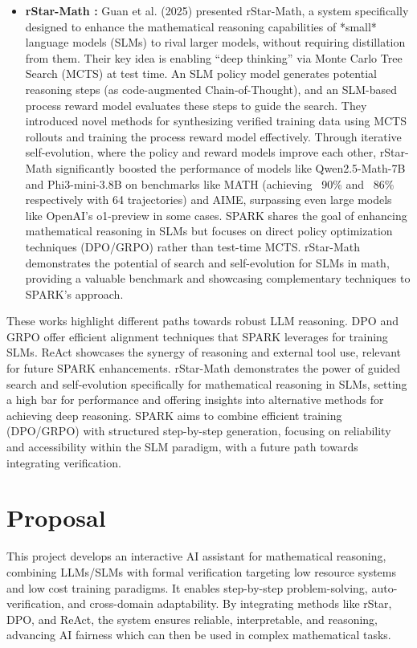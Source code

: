 \documentclass[11pt]{article}
\begin{document}
\begin{itemize}
    \item \textbf{rStar-Math \cite{guan2025rstar}:}
    Guan et al. (2025) presented rStar-Math, a system specifically designed to enhance the mathematical reasoning capabilities of *small* language models (SLMs) to rival larger models, without requiring distillation from them. Their key idea is enabling ``deep thinking'' via Monte Carlo Tree Search (MCTS) at test time. An SLM policy model generates potential reasoning steps (as code-augmented Chain-of-Thought), and an SLM-based process reward model evaluates these steps to guide the search. They introduced novel methods for synthesizing verified training data using MCTS rollouts and training the process reward model effectively. Through iterative self-evolution, where the policy and reward models improve each other, rStar-Math significantly boosted the performance of models like Qwen2.5-Math-7B and Phi3-mini-3.8B on benchmarks like MATH (achieving ~90\% and ~86\% respectively with 64 trajectories) and AIME, surpassing even large models like OpenAI's o1-preview in some cases. SPARK shares the goal of enhancing mathematical reasoning in SLMs but focuses on direct policy optimization techniques (DPO/GRPO) rather than test-time MCTS. rStar-Math demonstrates the potential of search and self-evolution for SLMs in math, providing a valuable benchmark and showcasing complementary techniques to SPARK's approach.
\end{itemize}

These works highlight different paths towards robust LLM reasoning. DPO and GRPO offer efficient alignment techniques that SPARK leverages for training SLMs. ReAct showcases the synergy of reasoning and external tool use, relevant for future SPARK enhancements. rStar-Math demonstrates the power of guided search and self-evolution specifically for mathematical reasoning in SLMs, setting a high bar for performance and offering insights into alternative methods for achieving deep reasoning. SPARK aims to combine efficient training (DPO/GRPO) with structured step-by-step generation, focusing on reliability and accessibility within the SLM paradigm, with a future path towards integrating verification.

\section{Proposal}
This project develops an interactive AI assistant for mathematical reasoning, combining LLMs/SLMs with formal verification targeting low resource systems and low cost training paradigms. It enables step-by-step problem-solving, auto-verification, and cross-domain adaptability. By integrating methods like rStar, DPO, and ReAct, the system ensures reliable, interpretable, and reasoning, advancing AI fairness which can then be used in complex mathematical tasks.
\end{document}
